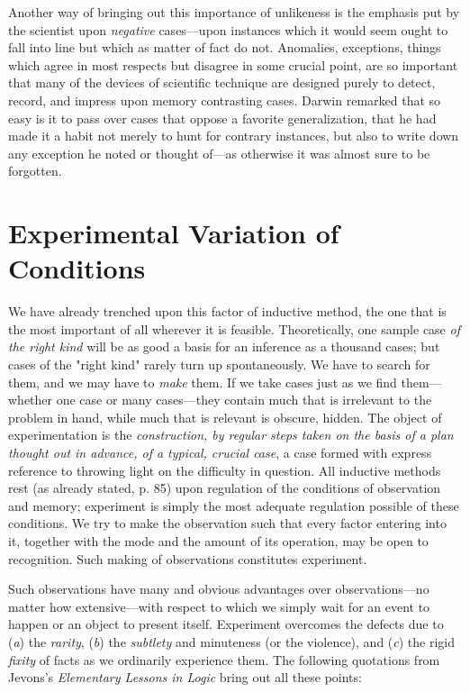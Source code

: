 \documentclass[letterpaper]{book}
\begin{document}

Another way of bringing out this importance of unlikeness is the
emphasis put by the scientist upon \emph{negative} cases---upon
instances which it would seem ought to fall into line but which as
matter of fact do not. Anomalies, exceptions, things which agree in most
respects but disagree in some crucial point, are so important that many
of the devices of scientific technique are designed purely to detect,
record, and impress upon memory contrasting cases. Darwin remarked that
so easy is it to pass over cases that oppose a favorite generalization,
that he had made it a habit not merely to hunt for contrary instances,
but also to write down any exception he noted or thought of---as
otherwise it was almost sure to be
forgotten.

\section{Experimental Variation of Conditions}


We have already trenched upon this factor of inductive method, the one
that is the most important of all wherever it is feasible.
Theoretically, one sample case \emph{of the right kind} will be as good
a basis for an inference as a thousand cases; but cases of the "right
kind" rarely turn up spontaneously. We have to search for them, and we
may have to \emph{make} them. If we take cases just as we find
them---whether one case or many cases---they contain much that is
irrelevant to the problem in hand, while much that is relevant is
obscure, hidden. The object of experimentation is the
\emph{construction, by regular steps taken on the basis of a plan
thought out in advance, of a typical, crucial case}, a case formed with
express reference to throwing light on the difficulty in question. All
inductive methods rest (as already stated, p. 85) upon regulation of the
conditions of observation and memory; experiment is simply the most
adequate regulation possible of these conditions. We try to make the
observation such that every factor entering into it, together with the
mode and the amount of its operation, may be open to recognition. Such
making of observations constitutes experiment.


Such observations have many and obvious advantages over
observations---no matter how extensive---with respect to which we simply
wait for an event to happen or an object to present itself. Experiment
overcomes the defects due to (\emph{a}) the \emph{rarity}, (\emph{b})
the \emph{subtlety} and minuteness (or the violence), and (\emph{c}) the
rigid \emph{fixity} of facts as we ordinarily experience them. The
following quotations from Jevons's \emph{Elementary Lessons in Logic}
bring out all these points:
\end{document}
